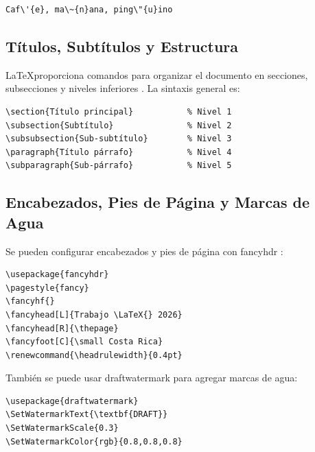 \begin{verbatim}
Caf\'{e}, ma\~{n}ana, ping\"{u}ino
\end{verbatim}

\subsection{Títulos, Subtítulos y Estructura}

\LaTeX proporciona comandos para organizar el documento en secciones, subsecciones y niveles inferiores \cite{latex_project}. La sintaxis general es:

\begin{verbatim}
\section{Título principal}           % Nivel 1
\subsection{Subtítulo}               % Nivel 2
\subsubsection{Sub-subtítulo}        % Nivel 3
\paragraph{Título párrafo}           % Nivel 4
\subparagraph{Sub-párrafo}           % Nivel 5
\end{verbatim}

\subsection{Encabezados, Pies de Página y Marcas de Agua}

Se pueden configurar encabezados y pies de página con fancyhdr \cite{fancyhdr}:

\begin{verbatim}
\usepackage{fancyhdr}
\pagestyle{fancy}
\fancyhf{}
\fancyhead[L]{Trabajo \LaTeX{} 2026} 
\fancyhead[R]{\thepage} 
\fancyfoot[C]{\small Costa Rica}
\renewcommand{\headrulewidth}{0.4pt}
\end{verbatim}

También se puede usar draftwatermark \cite{draftwatermark} para agregar marcas de agua:

\begin{verbatim}
\usepackage{draftwatermark}
\SetWatermarkText{\textbf{DRAFT}}
\SetWatermarkScale{0.3}
\SetWatermarkColor{rgb}{0.8,0.8,0.8}
\end{verbatim}

